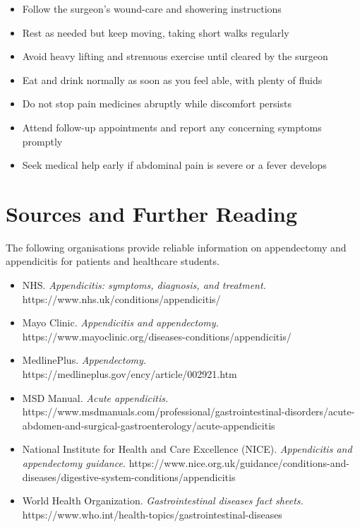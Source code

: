 \begin{itemize}
    \item Follow the surgeon's wound-care and showering instructions
    \item Rest as needed but keep moving, taking short walks regularly
    \item Avoid heavy lifting and strenuous exercise until cleared by the surgeon
    \item Eat and drink normally as soon as you feel able, with plenty of fluids
    \item Do not stop pain medicines abruptly while discomfort persists
    \item Attend follow-up appointments and report any concerning symptoms promptly
    \item Seek medical help early if abdominal pain is severe or a fever develops
\end{itemize}

\section*{Sources and Further Reading}
The following organisations provide reliable information on appendectomy and appendicitis for patients and healthcare students.

\begin{itemize}
    \item NHS. \textit{Appendicitis: symptoms, diagnosis, and treatment.} https://www.nhs.uk/conditions/appendicitis/
    \item Mayo Clinic. \textit{Appendicitis and appendectomy.} https://www.mayoclinic.org/diseases-conditions/appendicitis/
    \item MedlinePlus. \textit{Appendectomy.} https://medlineplus.gov/ency/article/002921.htm
    \item MSD Manual. \textit{Acute appendicitis.} https://www.msdmanuals.com/professional/gastrointestinal-disorders/acute-abdomen-and-surgical-gastroenterology/acute-appendicitis
    \item National Institute for Health and Care Excellence (NICE). \textit{Appendicitis and appendectomy guidance.} https://www.nice.org.uk/guidance/conditions-and-diseases/digestive-system-conditions/appendicitis
    \item World Health Organization. \textit{Gastrointestinal diseases fact sheets.} https://www.who.int/health-topics/gastrointestinal-diseases
\end{itemize}
